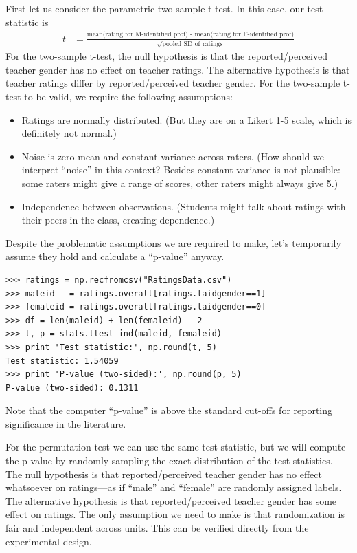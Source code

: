 First let us consider the parametric two-sample t-test.  In this case, our
test statistic is
\begin{align*}
t &= \frac{\text{mean(rating for M-identified prof) - mean(rating for F-identified prof)}}{\sqrt{\text{pooled SD of ratings}}}
\end{align*}
For the two-sample t-test, the null hypothesis is that the reported/perceived
teacher gender has no effect on teacher ratings.  The alternative hypothesis
is that teacher ratings differ by reported/perceived teacher gender.  For the
two-sample t-test to be valid, we require the following assumptions:
\begin{itemize}
\item Ratings are normally distributed.  (But they are on a Likert 1-5 scale,
      which is definitely not normal.)
\item Noise is zero-mean and constant variance across raters.  (How should we interpret
      ``noise'' in this context?  Besides constant variance is not plausible: some
      raters might give a range of scores, other raters might always give 5.)
\item Independence between observations. (Students might talk about ratings with
      their peers in the class, creating dependence.)
\end{itemize}

Despite the problematic assumptions we are required to make, let's temporarily
assume they hold and calculate a ``p-value'' anyway.

\begin{verbatim}
>>> ratings = np.recfromcsv("RatingsData.csv")
>>> maleid   = ratings.overall[ratings.taidgender==1]
>>> femaleid = ratings.overall[ratings.taidgender==0]
>>> df = len(maleid) + len(femaleid) - 2
>>> t, p = stats.ttest_ind(maleid, femaleid)
>>> print 'Test statistic:', np.round(t, 5)
Test statistic: 1.54059
>>> print 'P-value (two-sided):', np.round(p, 5)
P-value (two-sided): 0.1311
\end{verbatim}
Note that the computer ``p-value'' is above the standard cut-offs for
reporting significance in the literature.

For the permutation test we can use the same test statistic, but we will
compute the p-value by randomly sampling the exact distribution of the test
statistics.  The null hypothesis is that reported/perceived teacher gender has
no effect whatsoever on ratings---as if ``male'' and ``female'' are randomly
assigned labels.  The alternative hypothesis is that reported/perceived teacher
gender has some effect on ratings.  The only assumption we need to make is that
randomization is fair and independent across units.  This can be verified
directly from the experimental design.

